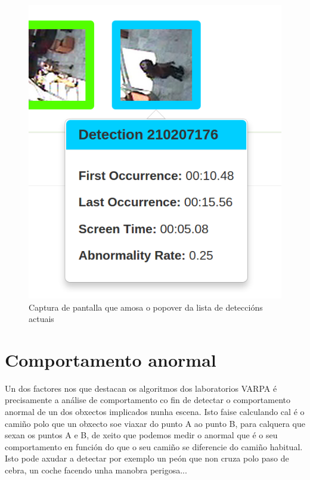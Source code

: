     \begin{figure}[htp]
    \begin{center}
        \includegraphics[scale=0.5]{figures/popoverCapture.png}
        \caption{Captura de pantalla que amosa o popover da lista de deteccións actuais}
    \label{fig:popoverCapture}
    \end{center}
    \end{figure}

    
\section{Comportamento anormal}

    Un dos factores nos que destacan os algoritmos dos laboratorios VARPA é precisamente a análise
    de comportamento co fin de detectar o comportamento anormal de un dos obxectos implicados nunha
    escena. Isto faise calculando cal é o camiño polo que un obxecto soe viaxar do punto A ao 
    punto B, para calquera que sexan os puntos A e B, de xeito que podemos medir o anormal que é
    o seu comportamento en función do que o seu camiño se diferencie do camiño habitual. Isto pode
    axudar a detectar por exemplo un peón que non cruza polo paso de cebra, un coche facendo unha 
    manobra perigosa...
    
